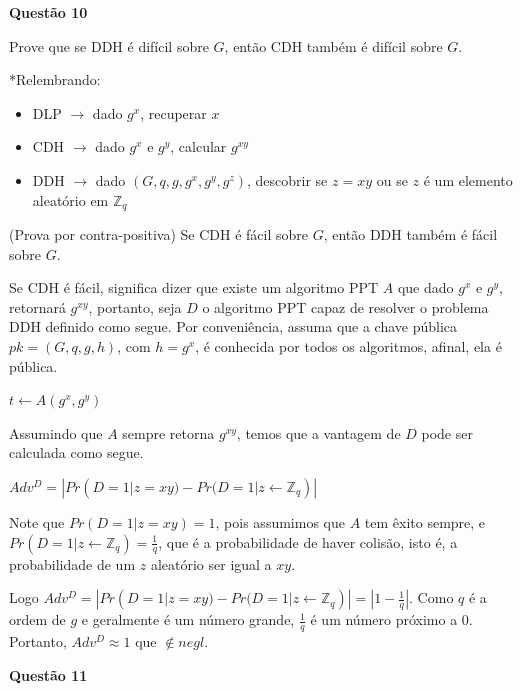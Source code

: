\documentclass{article}
\begin{document}
\textbf{Questão 10}

    Prove que se DDH é difícil sobre $G$, então CDH também é difícil sobre $G$.

    *Relembrando: 
    \begin{itemize}
        \item DLP $\rightarrow$ dado $g^x$, recuperar $x$
        \item CDH $\rightarrow$ dado $g^x$ e $g^y$, calcular $g^{xy}$
        \item DDH $\rightarrow$ dado $(G,q,g,g^x,g^y,g^z)$, descobrir se $z = xy$ ou se $z$ é um elemento aleatório em $\mathbb{Z}_q$
    \end{itemize}

    (Prova por contra-positiva) Se CDH é fácil sobre $G$, então DDH também é fácil sobre $G$.

    Se CDH é fácil, significa dizer que existe um algoritmo PPT $A$ que dado $g^x$ e $g^y$, retornará $g^{xy}$, portanto, seja $D$ o algoritmo PPT capaz de resolver o problema DDH definido como segue. Por conveniência, assuma que a chave pública $pk = (G,q,g,h)$, com $h = g^x$, é conhecida por todos os algoritmos, afinal, ela é pública.

    \begin{algorithm}[H]
        \caption{$D$}

        $t \leftarrow A(g^x, g^y)$

    \end{algorithm}  

    Assumindo que $A$ sempre retorna $g^{xy}$, temos que a vantagem de $D$ pode ser calculada como segue.

    $Adv^D = |Pr(D = 1 | z = xy) - Pr(D = 1| z \leftarrow \mathbb{Z}_q)|$

    Note que $Pr(D = 1 | z = xy) = 1$, pois assumimos que $A$ tem êxito sempre, e $Pr(D = 1| z \leftarrow \mathbb{Z}_q) = \frac{1}{q}$, que é a probabilidade de haver colisão, isto é, a probabilidade de um $z$ aleatório ser igual a $xy$.

    Logo $Adv^D = |Pr(D = 1 | z = xy) - Pr(D = 1| z \leftarrow \mathbb{Z}_q)| = |1 - \frac{1}{q}|$. Como $q$ é a ordem de $g$ e geralmente é um número grande, $\frac{1}{q}$ é um número próximo a 0. Portanto, $Adv^D \approx 1$ que $\notin negl$.

\textbf{Questão 11}
\end{document}
